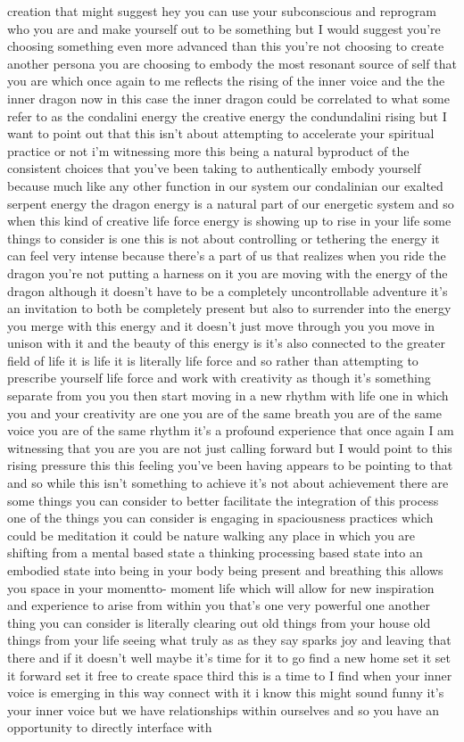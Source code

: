 \documentclass{article}
\begin{document}
creation that might suggest hey you can use your subconscious and reprogram who you are and make yourself out to be something but I would suggest you're choosing something even more advanced than this you're not choosing to create another persona you are choosing to embody the most resonant source of self that you are which once again to me reflects the rising of the inner voice and the the inner dragon now in this case the inner dragon could be correlated to what some refer to as the condalini energy the creative energy the condundalini rising but I want to point out that this isn't about attempting to accelerate your spiritual practice or not i'm witnessing more this being a natural byproduct of the consistent choices that you've been taking to authentically embody yourself because much like any other function in our system our condalinian our exalted serpent energy the dragon energy is a natural part of our energetic system and so when this kind of creative life force energy is showing up to rise in your life some things to consider is one this is not about controlling or tethering the energy it can feel very intense because there's a part of us that realizes when you ride the dragon you're not putting a harness on it you are moving with the energy of the dragon although it doesn't have to be a completely uncontrollable adventure it's an invitation to both be completely present but also to surrender into the energy you merge with this energy and it doesn't just move through you you move in unison with it and the beauty of this energy is it's also connected to the greater field of life it is life it is literally life force and so rather than attempting to prescribe yourself life force and work with creativity as though it's something separate from you you then start moving in a new rhythm with life one in which you and your creativity are one you are of the same breath you are of the same voice you are of the same rhythm it's a profound experience that once again I am witnessing that you are you are not just calling forward but I would point to this rising pressure this this feeling you've been having appears to be pointing to that and so while this isn't something to achieve it's not about achievement there are some things you can consider to better facilitate the integration of this process one of the things you can consider is engaging in spaciousness practices which could be meditation it could be nature walking any place in which you are shifting from a mental based state a thinking processing based state into an embodied state into being in your body being present and breathing this allows you space in your momentto- moment life which will allow for new inspiration and experience to arise from within you that's one very powerful one another thing you can consider is literally clearing out old things from your house old things from your life seeing what truly as as they say sparks joy and leaving that there and if it doesn't well maybe it's time for it to go find a new home set it set it forward set it free to create space third this is a time to I find when your inner voice is emerging in this way connect with it i know this might sound funny it's your inner voice but we have relationships within ourselves and so you have an opportunity to directly interface with 
\end{document}
